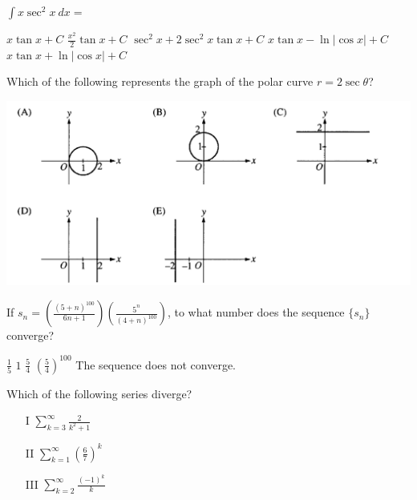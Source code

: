 \begin{questions}
\question[2] $\int x\sec^2 x\ dx = $

    \begin{oneparchoices}
    \choice $x\tan x + C$
    \choice $\frac{x^2}{2}\tan x + C$
    \choice $\sec^2 x + 2\sec^2 x \tan x + C$
    \choice $x\tan x - \ln |\cos x| + C$
    \CorrectChoice $x\tan x + \ln |\cos x| + C$
    \end{oneparchoices}

\question[2] Which of the following represents the graph of the polar
    curve $r = 2\sec \theta$?

    \includegraphics[scale=0.7]{BC5.png}    

\question[2] If $s_n =
(\frac{(5+n)^{100}}{6{n+1}})(\frac{5^n}{(4+n)^{100}})$, to what number
does the sequence $\{s_n\}$ converge?

    \begin{oneparchoices}
    \CorrectChoice $\frac{1}{5}$
    \choice $1$
    \choice $\frac{5}{4}$
    \choice $(\frac{5}{4})^{100}$
    \choice The sequence does not converge.
    \end{oneparchoices}

\question[2] Which of the following series diverge?
            
    \begin{enumerate}
    \item[I] $\sum_{k = 3}^\infty \frac{2}{k^2 + 1}$
    \item[II] $\sum_{k = 1}^\infty (\frac{6}{7})^k$
    \item[III] $\sum_{k = 2}^\infty \frac{(-1)^k}{k}$
    \end{enumerate}


\end{questions}

